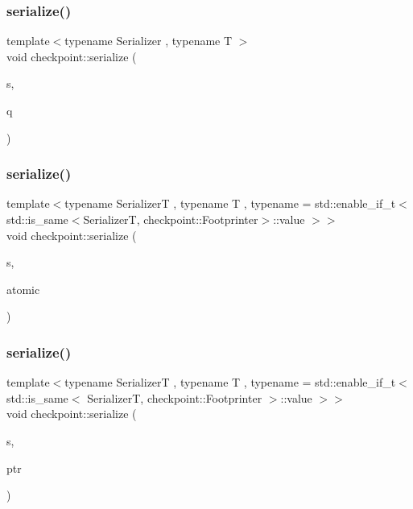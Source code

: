 \mbox{\label{namespacecheckpoint_a9493433bed418b54358130463961ce50}} 
\subsubsection{\texorpdfstring{serialize()}{serialize()}\hspace{0.1cm}{\footnotesize\ttfamily [6/30]}}
{\footnotesize\ttfamily template$<$typename Serializer , typename T $>$ \\
void checkpoint\+::serialize (\begin{DoxyParamCaption}\item[{Serializer \&}]{s,  }\item[{const std\+::priority\+\_\+queue$<$ T $>$ \&}]{q }\end{DoxyParamCaption})}

\mbox{\label{namespacecheckpoint_a40ca9a5c99807bd8a0610098d94b5125}} 
\subsubsection{\texorpdfstring{serialize()}{serialize()}\hspace{0.1cm}{\footnotesize\ttfamily [7/30]}}
{\footnotesize\ttfamily template$<$typename SerializerT , typename T , typename  = std\+::enable\+\_\+if\+\_\+t$<$    std\+::is\+\_\+same$<$\+Serializer\+T, checkpoint\+::\+Footprinter$>$\+::value  $>$$>$ \\
void checkpoint\+::serialize (\begin{DoxyParamCaption}\item[{SerializerT \&}]{s,  }\item[{const std\+::atomic$<$ T $>$ \&}]{atomic }\end{DoxyParamCaption})}

\mbox{\label{namespacecheckpoint_aff1bebba5ce7fda79f83d2af8c859254}} 
\subsubsection{\texorpdfstring{serialize()}{serialize()}\hspace{0.1cm}{\footnotesize\ttfamily [8/30]}}
{\footnotesize\ttfamily template$<$typename SerializerT , typename T , typename  = std\+::enable\+\_\+if\+\_\+t$<$    std\+::is\+\_\+same$<$      Serializer\+T,      checkpoint\+::\+Footprinter    $>$\+::value  $>$$>$ \\
void checkpoint\+::serialize (\begin{DoxyParamCaption}\item[{SerializerT \&}]{s,  }\item[{std\+::shared\+\_\+ptr$<$ T $>$ \&}]{ptr }\end{DoxyParamCaption})}

